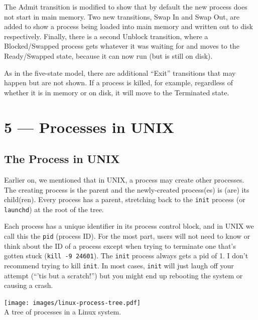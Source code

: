 \documentclass[a4paper]{report}
\begin{document}
The Admit transition is modified to show that by default the new process does not start in main memory. Two new transitions, Swap In and Swap Out, are added to show a process being loaded into main memory and written out to disk respectively. Finally, there is a second Unblock transition, where a Blocked/Swapped process gets whatever it was waiting for and moves to the Ready/Swapped state, because it can now run (but is still on disk).

As in the five-state model, there are additional ``Exit'' transitions that may happen but are not shown. If a process is killed, for example, regardless of whether it is in memory or on disk, it will move to the Terminated state.










\chapter*{5 --- Processes in UNIX}


\section*{The Process in UNIX}

Earlier on, we mentioned  that in UNIX, a process may create other processes. The creating process is the parent and the newly-created process(es) is (are) its child(ren). Every process has a parent, stretching back to the \texttt{init} process (or \texttt{launchd}) at the root of the tree.

Each process has a unique identifier in its process control block, and in UNIX we call this the \texttt{pid} (process ID). For the most part, users will not need to know or think about the ID of a process except when trying to terminate one that's gotten stuck (\texttt{kill -9 24601}). The \texttt{init} process always gets a pid of 1. I don't recommend trying to kill \texttt{init}. In most cases, \texttt{init} will just laugh off your attempt (``'tis but a scratch!'') but you might end up rebooting the system or causing a crash.

\begin{center}
	\texttt{[image: images/linux-process-tree.pdf]}\\
	A tree of processes in a Linux system.
\end{center}
\end{document}
